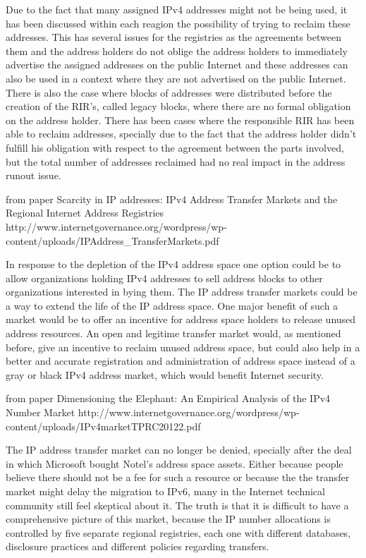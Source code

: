 \documentclass[11pt]{report}
\begin{document}
Due to the fact that many assigned IPv4 addresses might not be being used, it has been discussed within each reagion the possibility of trying to reclaim these addresses. This has several issues for the registries as the agreements between them and the address holders do not oblige the address holders to immediately advertise the assigned addresses on the public Internet and these addresses can also be used in a context where they are not advertised on the public Internet. There is also the case where blocks of addresses were distributed before the creation of the RIR's, called legacy blocks, where there are no formal obligation on the address holder. There has been cases where the responsible RIR has been able to reclaim addresses, specially due to the fact that the address holder didn't fulfill his obligation with respect to the agreement between the parts involved, but the total number of addresses reclaimed had no real impact in the address runout issue.

from paper Scarcity in IP addresses: IPv4 Address Transfer Markets and the Regional Internet Address Registries http://www.internetgovernance.org/wordpress/wp-content/uploads/IPAddress\_TransferMarkets.pdf

In response to the depletion of the IPv4 address space one option could be to allow organizations holding IPv4 addresses to sell address blocks to other organizations interested in bying them. The IP address transfer markets could be a way to extend the life of the IP address space. One major benefit of such a market would be to offer an incentive for address space holders to release unused address resources. An open and legitime transfer market would, as mentioned before, give an incentive to reclaim unused address space, but could also help in a better and accurate registration and administration of address space instead of a gray or black IPv4 address market, which would benefit Internet security.  

from paper Dimensioning the Elephant: An Empirical Analysis of the IPv4 Number Market http://www.internetgovernance.org/wordpress/wp-content/uploads/IPv4marketTPRC20122.pdf

The IP address transfer market can no longer be denied, specially after the deal in which Microsoft bought Notel's address space assets. Either because people believe there should not be a fee for such a resource or because the the transfer market might delay the migration to IPv6, many in the Internet technical community still feel skeptical about it. The truth is that it is difficult to have a comprehensive picture of this market, because the IP number allocations is controlled by five separate regional registries, each one with different databases, disclosure practices and different policies regarding transfers. 
\end{document}
